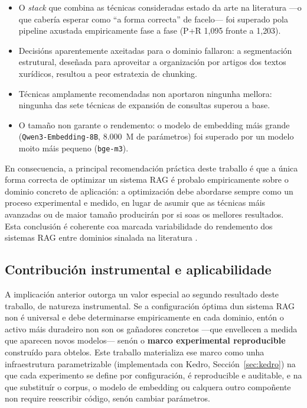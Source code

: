 \documentclass[11pt, a4paper, oneside]{report}
\begin{document}
\begin{itemize}
  \item O \textit{stack} que combina as técnicas consideradas estado da arte na
    literatura —o que cabería esperar como \enquote{a forma correcta} de facelo— foi
    superado pola pipeline axustada empiricamente fase a fase (P+R 1{,}095 fronte a
    1{,}203).
  \item Decisións aparentemente axeitadas para o dominio fallaron: a segmentación
    estrutural, deseñada para aproveitar a organización por artigos dos textos xurídicos,
    resultou a peor estratexia de chunking.
  \item Técnicas amplamente recomendadas non aportaron ningunha mellora: ningunha das
    sete técnicas de expansión de consultas superou a base.
  \item O tamaño non garante o rendemento: o modelo de embedding máis grande
    (\texttt{Qwen3-Embedding-8B}, 8.000~M de parámetros) foi superado por un modelo moito
    máis pequeno (\texttt{bge-m3}).
\end{itemize}

En consecuencia, a principal recomendación práctica deste traballo é que a única forma
correcta de optimizar un sistema RAG é probalo empiricamente sobre o dominio concreto de
aplicación: a optimización debe abordarse sempre como un proceso experimental e medido,
en lugar de asumir que as técnicas máis avanzadas ou de maior tamaño producirán por si
soas os mellores resultados. Esta conclusión é coherente coa marcada variabilidade do
rendemento dos sistemas RAG entre dominios sinalada na literatura
\citep{gao2023retrieval}.

\subsection*{Contribución instrumental e aplicabilidade}

A implicación anterior outorga un valor especial ao segundo resultado deste traballo, de
natureza instrumental. Se a configuración óptima dun sistema RAG non é universal e debe
determinarse empiricamente en cada dominio, entón o activo máis duradeiro non son os
gañadores concretos —que envellecen a medida que aparecen novos modelos— senón o
\textbf{marco experimental reproducible} construído para obtelos. Este traballo materializa
ese marco como unha infraestrutura parametrizable (implementada con Kedro,
Sección~\ref{sec:kedro}) na que cada experimento se define por configuración, é
reproducible e auditable, e na que substituír o corpus, o modelo de embedding ou calquera
outro compoñente non require reescribir código, senón cambiar parámetros.
\end{document}
